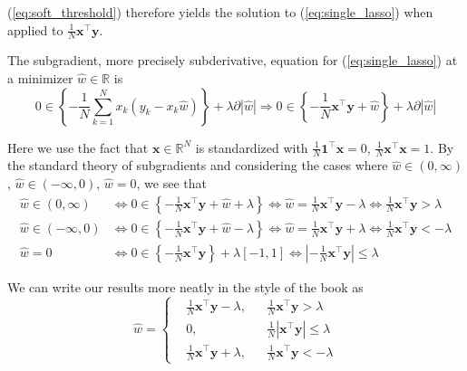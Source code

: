 \documentclass{article}
\numberwithin{equation}{section}
\begin{document}
(\ref{eq:soft_threshold}) therefore yields the solution to
(\ref{eq:single_lasso}) when applied to
$ \frac{1}{N}\mathbf{x}^\top\mathbf{y} $.


The subgradient, more precisely subderivative, equation for
(\ref{eq:single_lasso}) at a minimizer $ \hat{w} \in \mathbb{R} $ is
\begin{equation*}
    0 \in
    \left\{-\frac{1}{N}\sum_{k = 1}^Nx_k(y_k - x_k\hat{w})\right\} +
    \lambda\partial|\hat{w}| \Rightarrow
    0 \in
    \left\{-\frac{1}{N}\mathbf{x}^\top\mathbf{y} + \hat{w}\right\} +
    \lambda\partial|\hat{w}|
\end{equation*}

Here we use the fact that $ \mathbf{x} \in \mathbb{R}^N $ is standardized
with $ \frac{1}{N}\mathbf{1}^\top\mathbf{x} = 0 $,
$ \frac{1}{N}\mathbf{x}^\top\mathbf{x} = 1 $. By the standard theory of
subgradients and considering the cases where $ \hat{w} \in (0, \infty) $,
$ \hat{w} \in(-\infty, 0) $, $ \hat{w} = 0 $, we see that
\begin{equation*}
    \begin{split}
            \hat{w} \in (0, \infty) & \Leftrightarrow
            0 \in \left\{
                -\frac{1}{N}\mathbf{x}^\top\mathbf{y} + \hat{w} + \lambda
            \right\} \Leftrightarrow
            \hat{w} = \frac{1}{N}\mathbf{x}^\top\mathbf{y} - \lambda
            \Leftrightarrow \frac{1}{N}\mathbf{x}^\top\mathbf{y} > \lambda \\
            \hat{w} \in (-\infty, 0) & \Leftrightarrow
            0 \in \left\{
                -\frac{1}{N}\mathbf{x}^\top\mathbf{y} + \hat{w} - \lambda
            \right\} \Leftrightarrow
            \hat{w} = \frac{1}{N}\mathbf{x}^\top\mathbf{y} + \lambda
            \Leftrightarrow \frac{1}{N}\mathbf{x}^\top\mathbf{y} < -\lambda \\
            \hat{w} = 0 & \Leftrightarrow
            0 \in \left\{-\frac{1}{N}\mathbf{x}^\top\mathbf{y}\right\} +
            \lambda[-1, 1] \Leftrightarrow
            \left|-\frac{1}{N}\mathbf{x}^\top\mathbf{y}\right| \le \lambda
    \end{split}
\end{equation*}

We can write our results more neatly in the style of the book as
\begin{equation} \label{eq:2.3.1}
    \hat{w} = \left\{
        \begin{aligned}
            & \frac{1}{N}\mathbf{x}^\top\mathbf{y} - \lambda,
            & & \frac{1}{N}\mathbf{x}^\top\mathbf{y} > \lambda \\
            & 0, &
            & \frac{1}{N}\left|\mathbf{x}^\top\mathbf{y}\right| \le \lambda \\
            & \frac{1}{N}\mathbf{x}^\top\mathbf{y} + \lambda,
            & & \frac{1}{N}\mathbf{x}^\top\mathbf{y} < -\lambda
        \end{aligned}
    \right.
\end{equation}
\end{document}
